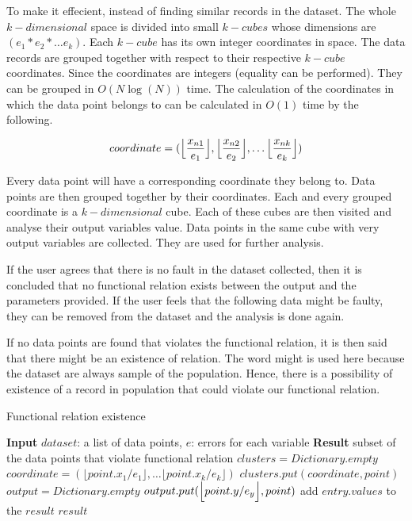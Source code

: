 To make it effecient, instead of finding similar records in the dataset. The whole \(k-dimensional\) space is divided into small \(k-cubes\) whose dimensions are \((e_1 * e_2 * \ldots e_k)\). Each \(k-cube\) has its own integer coordinates in space. The data records are grouped together with respect to their respective \(k-cube\) coordinates. Since the coordinates are integers (equality can be performed). They can be grouped in \(O(N\log(N))\) time. The calculation of the coordinates in which the data point belongs to can be calculated in \(O(1)\) time by the following.

\[coordinate = (\Bigl\lfloor \frac{x_{n1}}{e_1} \Bigl\rfloor, \Bigl\lfloor \frac{x_{n2}}{e_2} \Bigl\rfloor, \ldots \Bigl\lfloor \frac{x_{nk}}{e_k} \Bigl\rfloor)\]

Every data point will have a corresponding coordinate they belong to. Data points are then grouped together by their coordinates. Each and every grouped coordinate is a \(k-dimensional\) cube. Each of these cubes are then visited and analyse their output variables value. Data points in the same cube with very output variables are collected. They are used for further analysis.

If the user agrees that there is no fault in the dataset collected, then it is concluded that no functional relation exists between the output and the parameters provided. If the user feels that the following data might be faulty, they can be removed from the dataset and the analysis is done again.

If no data points are found that violates the functional relation, it is then said that there might be an existence of relation. The word might is used here because the dataset are always sample of the population. Hence, there is a possibility of existence of a record in population that could violate our functional relation.

\begin{algorithm}
	\caption{Functional relation existence}\label{gridExistence}
	\begin{algorithmic}[1]
		\State \textbf{Input} $dataset$: a list of data points, $e$: errors for each variable
		\State \textbf{Result} subset of the data points that violate functional relation
		\State $clusters = Dictionary.empty$
		\State $coordinate = (\lfloor point.x_{1}/e_1 \rfloor, \ldots \lfloor point.x_{k}/e_k \rfloor)$
		\State $clusters.put(coordinate, point)$
		\EndFor
		\State $output = Dictionary.empty$
		\State $output.put(\Bigl\lfloor point.y/e_y \Bigl\rfloor, point)$
		\EndFor
		 
		\State add $entry.values$ to the $result$
		\EndIf
        \EndFor
        \State\Return $result$
		\EndProcedure
	\end{algorithmic}
\end{algorithm}

